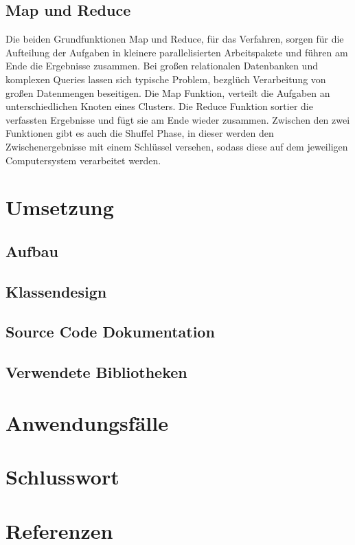 \documentclass[a4paper,12pt]{article}
\begin{document}
\subsection{Map und Reduce}
Die beiden Grundfunktionen Map und Reduce, für das Verfahren, sorgen für die Aufteilung der Aufgaben in kleinere parallelisierten Arbeitspakete und führen am Ende die Ergebnisse zusammen. Bei großen relationalen Datenbanken und komplexen Queries lassen sich typische Problem, bezglüch Verarbeitung von großen Datenmengen beseitigen.
Die Map Funktion, verteilt die Aufgaben an unterschiedlichen Knoten eines Clusters. Die Reduce Funktion sortier die verfassten Ergebnisse und fügt sie am Ende wieder zusammen.
Zwischen den zwei Funktionen gibt es auch die Shuffel Phase, in dieser werden den Zwischenergebnisse mit einem Schlüssel versehen, sodass diese auf dem jeweiligen Computersystem verarbeitet werden.
\section{Umsetzung}

\subsection{Aufbau}

\subsection{Klassendesign}

\subsection{Source Code Dokumentation}

\subsection{Verwendete Bibliotheken}

\section{Anwendungsfälle}

\section{Schlusswort}

\section{Referenzen}
\end{document}
